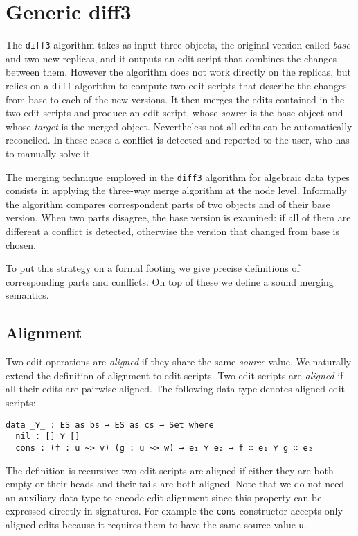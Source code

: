 \documentclass[preprint]{sigplanconf}
\begin{document}
\section{Generic diff3}
	The \texttt{diff3} algorithm takes as input three objects, the original
	version called \emph{base} and two new replicas, and it outputs an
	edit script that combines the changes between them.
	However the algorithm does not work directly on the replicas, but relies
	on a \texttt{diff} algorithm to compute two edit scripts that describe
	the changes from base to each of the new versions.
	It then merges the edits contained in the two edit scripts and produce
	an edit script, whose \emph{source} is the base object and whose 
	\emph{target} is the merged object.
	Nevertheless not all edits can be automatically reconciled.
	In these cases a conflict is detected and reported to the user, who has
	to manually solve it.
		
	The merging technique employed in the \texttt{diff3} algorithm for
	algebraic data types consists in applying the three-way merge algorithm
	at the node level. 
	Informally the algorithm compares correspondent parts 
	of two objects and of their base version.
	When two parts disagree, the base version is examined:
	if all of them are different a conflict is detected, 
        otherwise the version that changed from base is chosen.
	
	To put this strategy on a formal footing we give precise definitions
	of corresponding parts and conflicts.
	On top of these we define a sound merging semantics.

	\subsection{Alignment}
	Two edit operations are \emph{aligned} if they share the same 
	\emph{source} value. We naturally extend the definition of alignment to edit 
	scripts.	Two edit scripts are \emph{aligned} if all their edits are pairwise 
	aligned. The following data type denotes aligned edit scripts:	
\begin{verbatim}
data _⋎_ : ES as bs → ES as cs → Set where
  nil : [] ⋎ []
  cons : (f : u ~> v) (g : u ~> w) → e₁ ⋎ e₂ → f ∷ e₁ ⋎ g ∷ e₂ 
\end{verbatim}
	The definition is recursive: two edit scripts are aligned if either  
        they are both empty or their heads and their tails are both aligned.
	Note that we do not need an auxiliary data type to encode edit 
	alignment since this property can be expressed directly in signatures.
	For example the \texttt{cons} constructor accepts only aligned edits
	because it requires them to have the same source value \texttt{u}.
	
\end{document}
